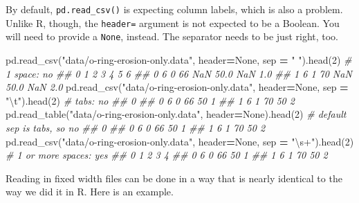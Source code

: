 \documentclass[
  12pt,
  krantz2]{krantz}
\makeatletter
\newenvironment{Shaded}{\begin{snugshade}}{\end{snugshade}}
\newcommand{\CharTok}[1]{\textcolor[rgb]{0.5,0.5,0.5}{#1}}
\newcommand{\CommentTok}[1]{\textcolor[rgb]{0.37,0.37,0.37}{\textit{#1}}}
\newcommand{\DecValTok}[1]{\textcolor[rgb]{0.06,0.06,0.06}{#1}}
\newcommand{\NormalTok}[1]{#1}
\newcommand{\OperatorTok}[1]{\textcolor[rgb]{0.43,0.43,0.43}{\textbf{#1}}}
\newcommand{\StringTok}[1]{\textcolor[rgb]{0.5,0.5,0.5}{#1}}
\newcommand{\VariableTok}[1]{\textcolor[rgb]{0,0,0}{#1}}
\newenvironment{kframe}{%
\medskip{}
\setlength{\fboxsep}{.8em}
 \def\at@end@of@kframe{}%
 \ifinner\ifhmode%
  \def\at@end@of@kframe{\end{minipage}}%
  \begin{minipage}{\columnwidth}%
 \fi\fi%
 \def\FrameCommand##1{\hskip\@totalleftmargin \hskip-\fboxsep
 \colorbox{shadecolor}{##1}\hskip-\fboxsep
     \hskip-\linewidth \hskip-\@totalleftmargin \hskip\columnwidth}%
 \MakeFramed {\advance\hsize-\width
   \@totalleftmargin\z@ \linewidth\hsize
   \@setminipage}}%
 {\par\unskip\endMakeFramed%
 \at@end@of@kframe}
\renewenvironment{Shaded}{\begin{kframe}}{\end{kframe}}
\makeatother
\begin{document}
By default, \texttt{pd.read\_csv()} is expecting column labels, which is also a problem. Unlike R, though, the \texttt{header=} argument is not expected to be a Boolean. You will need to provide a \texttt{None}, instead. The separator needs to be just right, too.

\begin{Shaded}
\begin{Highlighting}[]
\NormalTok{pd.read\_csv(}\StringTok{"data/o{-}ring{-}erosion{-}only.data"}\NormalTok{, }
\NormalTok{              header}\OperatorTok{=}\VariableTok{None}\NormalTok{, sep }\OperatorTok{=} \StringTok{" "}\NormalTok{).head(}\DecValTok{2}\NormalTok{) }\CommentTok{\# 1 space: no}
\CommentTok{\#\#    0  1   2   3     4   5    6}
\CommentTok{\#\# 0  6  0  66 NaN  50.0 NaN  1.0}
\CommentTok{\#\# 1  6  1  70 NaN  50.0 NaN  2.0}
\NormalTok{pd.read\_csv(}\StringTok{"data/o{-}ring{-}erosion{-}only.data"}\NormalTok{, }
\NormalTok{              header}\OperatorTok{=}\VariableTok{None}\NormalTok{, sep }\OperatorTok{=} \StringTok{"}\CharTok{\textbackslash{}t}\StringTok{"}\NormalTok{).head(}\DecValTok{2}\NormalTok{) }\CommentTok{\# tabs: no}
\CommentTok{\#\#                0}
\CommentTok{\#\# 0  6 0 66  50  1}
\CommentTok{\#\# 1  6 1 70  50  2}
\NormalTok{pd.read\_table(}\StringTok{"data/o{-}ring{-}erosion{-}only.data"}\NormalTok{, }
\NormalTok{              header}\OperatorTok{=}\VariableTok{None}\NormalTok{).head(}\DecValTok{2}\NormalTok{) }\CommentTok{\# default sep is tabs, so no}
\CommentTok{\#\#                0}
\CommentTok{\#\# 0  6 0 66  50  1}
\CommentTok{\#\# 1  6 1 70  50  2}
\NormalTok{pd.read\_csv(}\StringTok{"data/o{-}ring{-}erosion{-}only.data"}\NormalTok{, }
\NormalTok{              header}\OperatorTok{=}\VariableTok{None}\NormalTok{, sep }\OperatorTok{=} \StringTok{"\textbackslash{}s+"}\NormalTok{).head(}\DecValTok{2}\NormalTok{) }\CommentTok{\# 1 or more spaces: yes}
\CommentTok{\#\#    0  1   2   3  4}
\CommentTok{\#\# 0  6  0  66  50  1}
\CommentTok{\#\# 1  6  1  70  50  2}
\end{Highlighting}
\end{Shaded}

Reading in fixed width files can be done in a way that is nearly identical to the way we did it in R. Here is an example.
\end{document}
